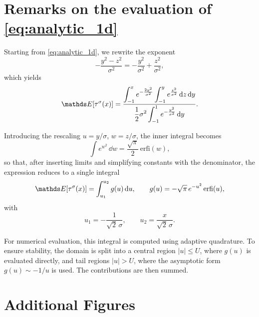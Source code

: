 \begin{subappendices}


\section{Remarks on the evaluation of \cref{eq:analytic_1d}}
    \label{app:NumRem}
    Starting from \cref{eq:analytic_1d}, we rewrite the exponent
    \[
        -\frac{y^2 - z^2}{\sigma^2} = -\frac{y^2}{\sigma^2} + \frac{z^2}{\sigma^2},
    \]
    which yields
    \[
        \E[\tau^\sigma (x)]
        = \frac{\displaystyle \int_{-1}^x e^{-\frac{2y^2}{\sigma^2}}
            \int_{-1}^y e^{\frac{z^2}{\sigma^2}}\,\dd z \,\dd y}
        {\displaystyle \frac{1}{2}\sigma^2 \int_{-1}^1 e^{-\frac{y^2}{\sigma^2}}\,\dd y}.
    \]

    Introducing the rescaling \(u = y/\sigma\), \(w = z/\sigma\), the inner integral becomes
    \[
        \int e^{w^2}\, \dd w = \frac{\sqrt{\pi}}{2}\,\mathrm{erfi}(w),
    \]
    so that, after inserting limits and simplifying constants with the denominator, the expression reduces to a single integral
    \[
        \E[\tau^\sigma(x)] = \int_{u_1}^{u_2} g(u)\, \dd u,
        \qquad
        g(u) = -\sqrt{\pi}\,e^{-u^2}\,\mathrm{erfi}(u),
    \]
    with
    \[
        u_1 = -\frac{1}{\sqrt{2}\,\sigma}, \qquad
        u_2 = \frac{x}{\sqrt{2}\,\sigma}.
    \]

    For numerical evaluation, this integral is computed using adaptive quadrature. To ensure stability, the domain is split into a central region \(|u|\le U\), where \(g(u)\) is evaluated directly, and tail regions \(|u|>U\), where the asymptotic form \(g(u)\sim -1/u\) is used. The contributions are then summed.


    \section{Additional Figures}\label{app:Figs}


\end{subappendices}
